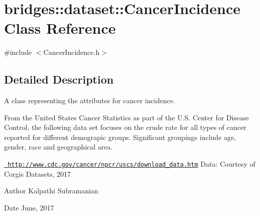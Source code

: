 \hypertarget{classbridges_1_1dataset_1_1_cancer_incidence}{}\section{bridges\+::dataset\+::Cancer\+Incidence Class Reference}
\label{classbridges_1_1dataset_1_1_cancer_incidence}


{\ttfamily \#include $<$Cancer\+Incidence.\+h$>$}



\subsection{Detailed Description}
A class representing the attributes for cancer incidence. 

From the United States Cancer Statistics as part of the U.\+S. Center for Disease Control, the following data set focuses on the crude rate for all types of cancer reported for different demograpic groups. Significant groupings include age, gender, race and geographical area.

\href{http://www.cdc.gov/cancer/npcr/uscs/download_data.htm}{\texttt{ http\+://www.\+cdc.\+gov/cancer/npcr/uscs/download\+\_\+data.\+htm}} Data\+: Courtesy of Corgis Datasets, 2017

\begin{DoxyAuthor}{Author}
Kalpathi Subramanian 
\end{DoxyAuthor}
\begin{DoxyDate}{Date}
June, 2017 
\end{DoxyDate}
